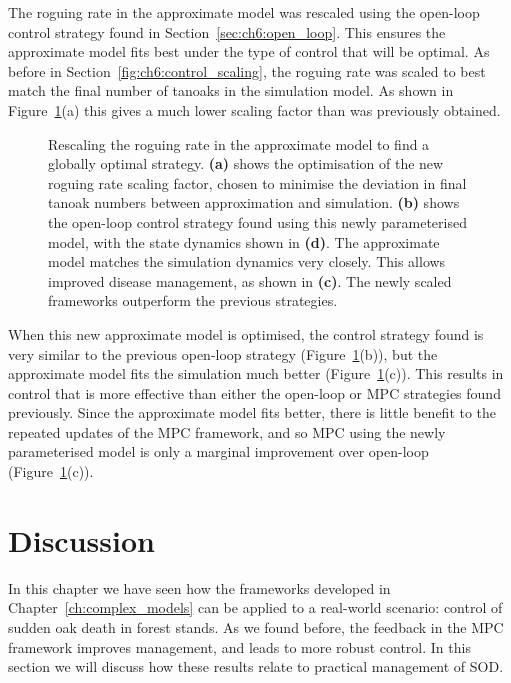 The roguing rate in the approximate model was rescaled using the open-loop control strategy found in Section~\ref{sec:ch6:open_loop}. This ensures the approximate model fits best under the type of control that will be optimal. As before in Section~\ref{fig:ch6:control_scaling}, the roguing rate was scaled to best match the final number of tanoaks in the simulation model. As shown in Figure~\ref{fig:ch6:Global_optimal}(a) this gives a much lower scaling factor than was previously obtained.

\begin{figure}[t!]
    \begin{center}
        \caption[Globally optimal strategy]{Rescaling the roguing rate in the approximate model to find a globally optimal strategy. \textbf{(a)} shows the optimisation of the new roguing rate scaling factor, chosen to minimise the deviation in final tanoak numbers between approximation and simulation. \textbf{(b)} shows the open-loop control strategy found using this newly parameterised model, with the state dynamics shown in \textbf{(d)}. The approximate model matches the simulation dynamics very closely. This allows improved disease management, as shown in \textbf{(c)}. The newly scaled frameworks outperform the previous strategies.\label{fig:ch6:Global_optimal}}
    \end{center}
\end{figure}

When this new approximate model is optimised, the control strategy found is very similar to the previous open-loop strategy (Figure~\ref{fig:ch6:Global_optimal}(b)), but the approximate model fits the simulation much better (Figure~\ref{fig:ch6:Global_optimal}(c)). This results in control that is more effective than either the open-loop or MPC strategies found previously. Since the approximate model fits better, there is little benefit to the repeated updates of the MPC framework, and so MPC using the newly parameterised model is only a marginal improvement over open-loop (Figure~\ref{fig:ch6:Global_optimal}(c)).

\FloatBarrier
\section{Discussion\label{sec:ch6:discussion}}

In this chapter we have seen how the frameworks developed in Chapter~\ref{ch:complex_models} can be applied to a real-world scenario: control of sudden oak death in forest stands. As we found before, the feedback in the MPC framework improves management, and leads to more robust control. In this section we will discuss how these results relate to practical management of SOD.

